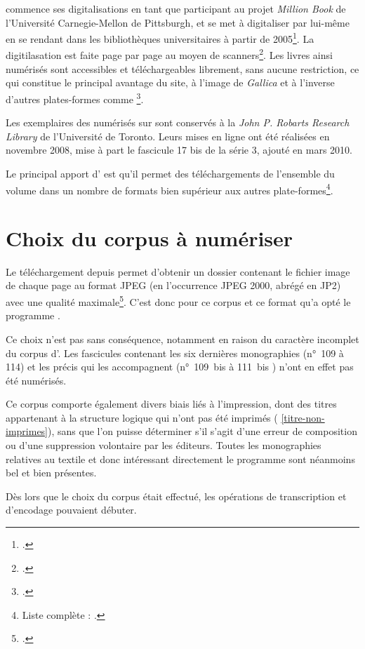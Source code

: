 \ia{} commence ses digitalisations en tant que participant au projet \textit{Million Book} de l'Université Carnegie-Mellon de Pittsburgh, et se met à digitaliser par lui-même en se rendant dans les bibliothèques universitaires à partir de 2005\footcite[p. 4]{Brewster2}. La digitilasation est faite page par page au moyen de scanners\footcite[p. 4]{Brewster2}. Les livres ainsi numérisés sont accessibles  et téléchargeables librement, sans aucune restriction, ce qui constitue le principal avantage du site, à l'image de \textit{Gallica} et à l'inverse d'autres plates-formes comme \gb\footcite[p. 1]{Brewster2}.

Les exemplaires des \odm{} numérisés sur \ia{} sont conservés à la \textit{John P. Robarts Research Library} de l'Université de Toronto. Leurs mises en ligne ont été réalisées en novembre 2008, mise à part le fascicule 17 bis de la série 3, ajouté en mars 2010.

Le principal apport d'\ia{} est qu'il permet des téléchargements de l'ensemble du volume dans un nombre de formats bien supérieur aux autres plate-formes\footnote{Liste complète : \cite[p. 33]{chague}.}.

\section{Choix du corpus à numériser}

Le téléchargement depuis \ia{} permet d'obtenir un dossier contenant le fichier image de chaque page au format JPEG (en l'occurrence JPEG 2000, abrégé en JP2) avec une qualité maximale\footcite{chague2}. C'est donc pour ce corpus et ce format qu'a opté le programme \timeus.

Ce choix n'est pas sans conséquence, notamment en raison du caractère incomplet du corpus d'\ia{}. Les fascicules contenant les six dernières monographies (n°~109 à 114) et les précis qui les accompagnent (n°~109~bis à 111~bis ) n'ont en effet pas été numérisés.

Ce corpus comporte également divers biais liés à l'impression, dont des titres appartenant à la structure logique qui n'ont pas été imprimés (\ann{} \ref{titre-non-imprimes}), sans que l'on puisse déterminer s'il s'agit d'une erreur de composition ou d'une suppression volontaire par les éditeurs. Toutes les monographies relatives au textile et donc intéressant directement le programme \timeus{} sont néanmoins bel et bien présentes.

Dès lors que le choix du corpus était effectué, les opérations de transcription et d'encodage pouvaient débuter.

